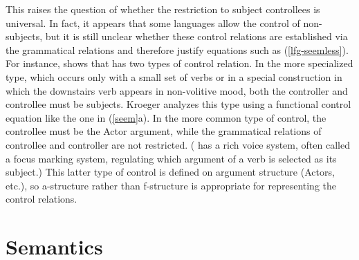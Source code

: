 This raises the question of whether the restriction to subject controllees is universal. In fact, it appears that some languages allow the control of non-subjects, but it is still unclear whether these control relations are established via the grammatical relations and therefore justify equations such as (\ref{lfg-seemless}).  For instance, \citet{kroeger:1993} shows that  has two types of control relation.  In the more specialized type, which occurs only with a small set of verbs or in a special construction in which the downstairs verb appears in non-volitive mood, both the controller and controllee must be subjects.  Kroeger analyzes this type using a functional control equation like the one in (\ref{seem}a).  In the more common type of  control, the controllee must be the Actor argument, while the grammatical relations of controllee and controller are not restricted.  ( has a rich voice system, often called a focus marking system, regulating which argument of a verb is selected as its subject.)  This latter type of  control is defined on argument structure (Actors, etc.), so a-structure rather than f-structure is appropriate for representing the control relations.



\section{Semantics}


